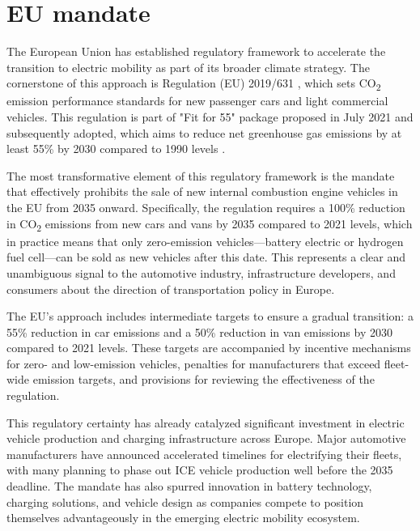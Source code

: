 \section{EU mandate}



The European Union has established regulatory framework to accelerate the transition to electric mobility as part of its broader climate strategy. The cornerstone of this approach is Regulation (EU) 2019/631 , which sets CO\textsubscript{2} emission performance standards for new passenger cars and light commercial vehicles. This regulation is part of "Fit for 55" package proposed in July 2021 and subsequently adopted, which aims to reduce net greenhouse gas emissions by at least 55\% by 2030 compared to 1990 levels .

The most transformative element of this regulatory framework is the mandate that effectively prohibits the sale of new internal combustion engine vehicles in the EU from 2035 onward. Specifically, the regulation requires a 100\% reduction in CO\textsubscript{2} emissions from new cars and vans by 2035 compared to 2021 levels, which in practice means that only zero-emission vehicles—battery electric or hydrogen fuel cell—can be sold as new vehicles after this date. This represents a clear and unambiguous signal to the automotive industry, infrastructure developers, and consumers about the direction of transportation policy in Europe.

The EU's approach includes intermediate targets to ensure a gradual transition: a 55\% reduction in car emissions and a 50\% reduction in van emissions by 2030 compared to 2021 levels. These targets are accompanied by incentive mechanisms for zero- and low-emission vehicles, penalties for manufacturers that exceed fleet-wide emission targets, and provisions for reviewing the effectiveness of the regulation.

This regulatory certainty has already catalyzed significant investment in electric vehicle production and charging infrastructure across Europe. Major automotive manufacturers have announced accelerated timelines for electrifying their fleets, with many planning to phase out ICE vehicle production well before the 2035 deadline. The mandate has also spurred innovation in battery technology, charging solutions, and vehicle design as companies compete to position themselves advantageously in the emerging electric mobility ecosystem.

